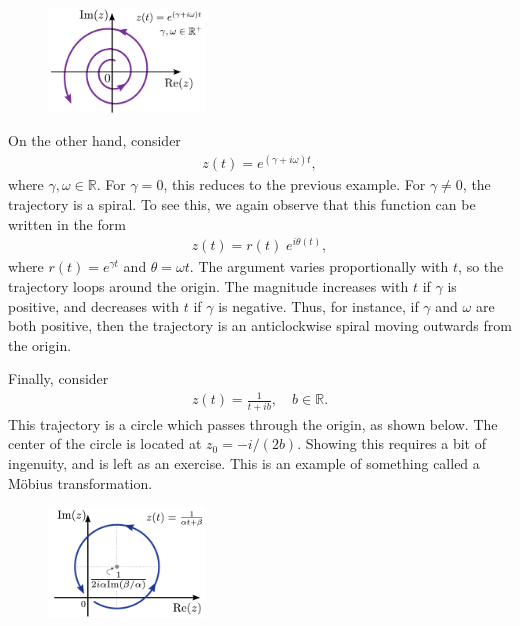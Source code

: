\documentclass[10pt,a4paper]{article}
\begin{document}
\begin{figure}[ht]
  \centering\includegraphics[width=0.37\textwidth]{complex_trajectory_2}
\end{figure}

On the other hand, consider
\begin{align}
  z(t) = e^{(\gamma + i \omega) t},
\end{align}
where $\gamma,\omega \in \mathbb{R}.$ For $\gamma = 0$, this reduces
to the previous example.  For $\gamma \ne 0$, the trajectory is a
spiral.  To see this, we again observe that this function can be
written in the form
\begin{align}
  z(t) = r(t) \;e^{i\theta(t)},
\end{align}
where $r(t) = e^{\gamma t}$ and $\theta = \omega t.$ The argument
varies proportionally with $t$, so the trajectory loops around the
origin.  The magnitude increases with $t$ if $\gamma$ is positive, and
decreases with $t$ if $\gamma$ is negative. Thus, for instance, if
$\gamma$ and $\omega$ are both positive, then the trajectory is an
anticlockwise spiral moving outwards from the origin.

Finally, consider
\begin{align}
  z(t) = \frac{1}{t + ib}, \quad b \in \mathbb{R}.
\end{align}
This trajectory is a circle which passes through the origin, as shown
below.  The center of the circle is located at $z_0 =
-i/(2b)$. Showing this requires a bit of ingenuity, and is left as an
exercise.  This is an example of something called a M\"obius
transformation.

\begin{figure}[ht]
  \centering\includegraphics[width=0.37\textwidth]{complex_trajectory_3}
\end{figure}
\end{document}
